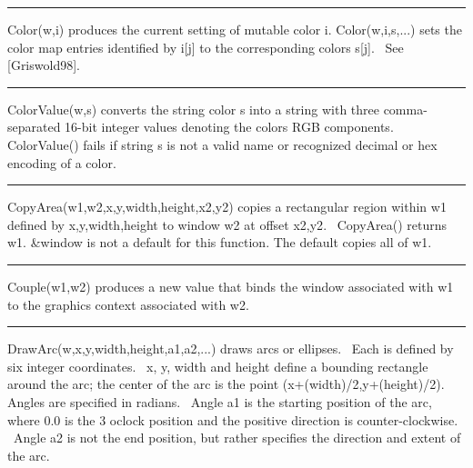 \bigskip\hrule\vspace{0.1cm}

\noindent
\textsf{Color(w,i)} produces the current setting of mutable color
\textsf{i}. \textsf{Color(w,i,s,...)} sets the color map entries
identified by \textsf{i[j]} to the corresponding colors \textsf{s[j]}.
\ See [Griswold98].

\bigskip\hrule\vspace{0.1cm}

\noindent
\textsf{ColorValue(w,s)} converts the string color \textsf{s} into a
string with three comma-separated 16-bit integer values denoting the
color{\textquotesingle}s RGB components. \textsf{ColorValue()} fails if
string \textsf{s} is not a valid name or recognized decimal or hex
encoding of a color.

\bigskip\hrule\vspace{0.1cm}

\noindent
\textsf{CopyArea(w1,w2,x,y,width,height,x2,y2)} copies a rectangular
region within \textsf{w1} defined by
\textsf{x},\textsf{y},\textsf{width},\textsf{height} to window
\textsf{w2} at offset \textsf{x2},\textsf{y2}. \ \textsf{CopyArea()}
returns \textsf{w1}. \textsf{\&window} is not a default for this
function. The default copies all of \textsf{w1}.

\bigskip\hrule\vspace{0.1cm}

\noindent
\textsf{Couple(w1,w2)} produces a new value that binds the window
associated with \textsf{w1} to the graphics context associated with
\textsf{w2}.

\bigskip\hrule\vspace{0.1cm}

\noindent
\textsf{DrawArc(w,x,y,width,height,a1,a2,...)} draws arcs or ellipses.
\ Each is defined by six integer coordinates. \ \textsf{x}, \textsf{y},
\textsf{width} and \textsf{height} define a bounding rectangle around
the arc; the center of the arc is the point
\textsf{(x+(width)/2,y+(height)/2)}. Angles are specified in radians.
\ Angle \textsf{a1} is the starting position of the arc, where 0.0 is
the 3 o{\textquotesingle}clock position and the positive direction is
counter-clockwise. \ Angle \textsf{a2} is not the end position, but
rather specifies the direction and extent of the arc.

